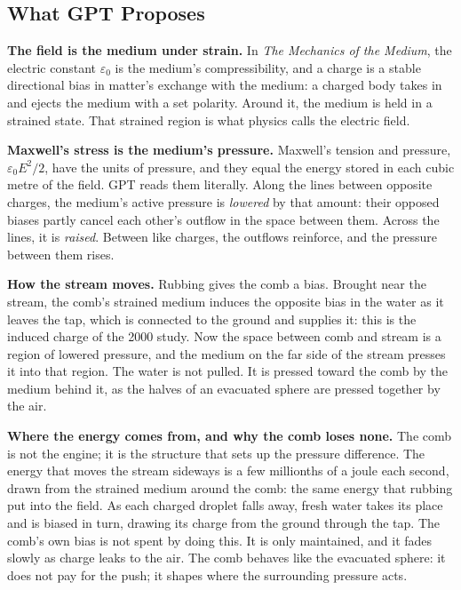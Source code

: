 \documentclass[11pt,a4paper]{article}
\begin{document}
\subsection*{What GPT Proposes}

\begin{hypbar}
\textbf{The field is the medium under strain.} In \emph{The Mechanics of the Medium}, the electric constant $\varepsilon_0$ is the medium's compressibility, and a charge is a stable directional bias in matter's exchange with the medium: a charged body takes in and ejects the medium with a set polarity.\footnotemark{} Around it, the medium is held in a strained state. That strained region is what physics calls the electric field.

\textbf{Maxwell's stress is the medium's pressure.} Maxwell's tension and pressure, $\varepsilon_0E^2/2$, have the units of pressure, and they equal the energy stored in each cubic metre of the field. GPT reads them literally. Along the lines between opposite charges, the medium's active pressure is \emph{lowered} by that amount: their opposed biases partly cancel each other's outflow in the space between them. Across the lines, it is \emph{raised}. Between like charges, the outflows reinforce, and the pressure between them rises.

\textbf{How the stream moves.} Rubbing gives the comb a bias. Brought near the stream, the comb's strained medium induces the opposite bias in the water as it leaves the tap, which is connected to the ground and supplies it: this is the induced charge of the 2000 study. Now the space between comb and stream is a region of lowered pressure, and the medium on the far side of the stream presses it into that region. The water is not pulled. It is pressed toward the comb by the medium behind it, as the halves of an evacuated sphere are pressed together by the air.

\textbf{Where the energy comes from, and why the comb loses none.} The comb is not the engine; it is the structure that sets up the pressure difference. The energy that moves the stream sideways is a few millionths of a joule each second, drawn from the strained medium around the comb: the same energy that rubbing put into the field. As each charged droplet falls away, fresh water takes its place and is biased in turn, drawing its charge from the ground through the tap. The comb's own bias is not spent by doing this. It is only maintained, and it fades slowly as charge leaks to the air. The comb behaves like the evacuated sphere: it does not pay for the push; it shapes where the surrounding pressure acts.
\end{hypbar}
\end{document}
